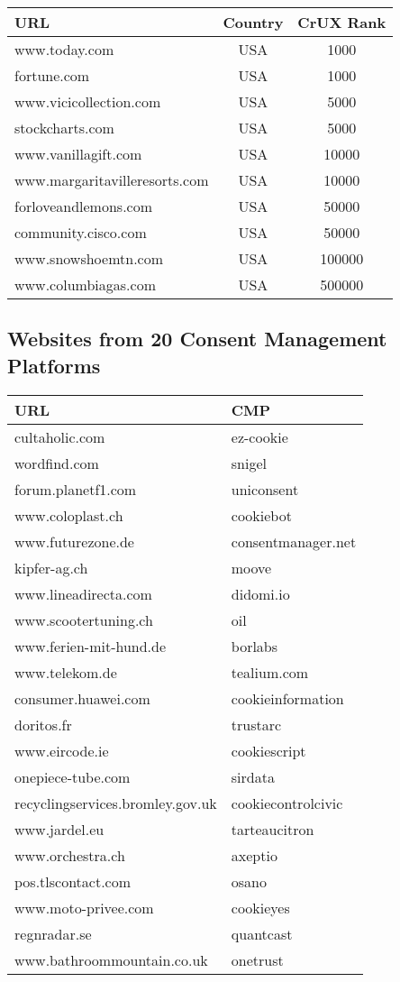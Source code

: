 \begin{center}
\begin{tabular}{lcc}
	\toprule
	URL                      & Country & CrUX Rank \\
	\midrule
    www.today.com            & USA & 1000 \\
    fortune.com              & USA & 1000 \\
    www.vicicollection.com   & USA & 5000 \\
    stockcharts.com          & USA & 5000 \\
    www.vanillagift.com      & USA & 10000 \\
    www.margaritavilleresorts.com  & USA & 10000 \\
    forloveandlemons.com     & USA & 50000 \\
    community.cisco.com      & USA & 50000 \\
    www.snowshoemtn.com      & USA & 100000 \\
    www.columbiagas.com      & USA & 500000 \\
	\bottomrule
\end{tabular}
\end{center}
\subsection{Websites from 20 Consent Management Platforms}
\begin{center}
\begin{tabular}{ll}
	\toprule
	URL   & CMP        \\
	\midrule
    cultaholic.com & ez-cookie \\
    wordfind.com & snigel \\
    forum.planetf1.com & uniconsent \\
    www.coloplast.ch & cookiebot \\
    www.futurezone.de & consentmanager.net \\
    kipfer-ag.ch & moove \\
    www.lineadirecta.com & didomi.io \\
    www.scootertuning.ch & oil \\
    www.ferien-mit-hund.de & borlabs \\
    www.telekom.de & tealium.com \\
    consumer.huawei.com & cookieinformation \\
    doritos.fr & trustarc \\
    www.eircode.ie & cookiescript \\
    onepiece-tube.com & sirdata \\
    recyclingservices.bromley.gov.uk & cookiecontrolcivic \\
    www.jardel.eu & tarteaucitron \\
    www.orchestra.ch & axeptio \\
    pos.tlscontact.com & osano \\
    www.moto-privee.com & cookieyes \\
    regnradar.se & quantcast \\
    www.bathroommountain.co.uk & onetrust \\
	\bottomrule
\end{tabular}
\end{center}
